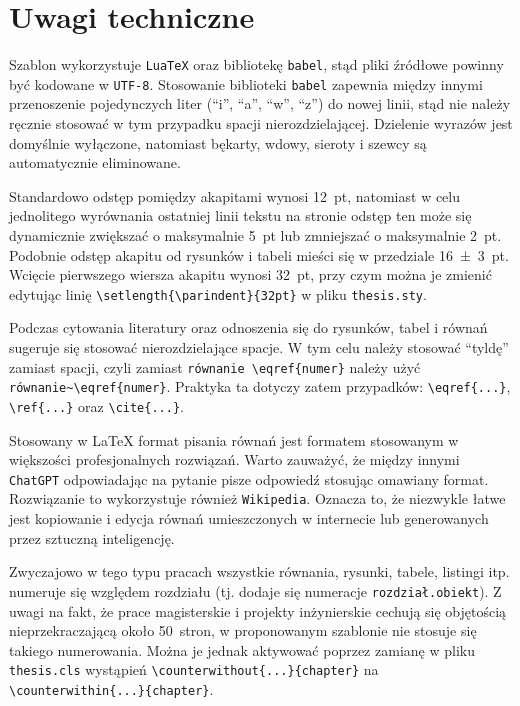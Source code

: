 \begin{listing}[ht!]
\inputminted[linenos, breaklines]{tex}{thesis.tex}
\end{listing}

\section{Uwagi techniczne}

Szablon wykorzystuje \verb|LuaTeX| oraz bibliotekę \verb|babel|, stąd pliki źródłowe powinny być kodowane w \verb|UTF-8|. Stosowanie biblioteki \verb|babel| zapewnia między innymi przenoszenie pojedynczych liter (\enquote{i}, \enquote{a}, \enquote{w}, \enquote{z}) do nowej linii, stąd nie należy ręcznie stosować w tym przypadku spacji nierozdzielającej. Dzielenie wyrazów jest domyślnie wyłączone, natomiast bękarty, wdowy, sieroty i szewcy są automatycznie eliminowane. 

Standardowo odstęp pomiędzy akapitami wynosi \qty{12}{pt}, natomiast w celu jednolitego wyrównania ostatniej linii tekstu na stronie odstęp ten może się dynamicznie zwiększać o maksymalnie \qty{5}{pt} lub zmniejszać o maksymalnie \qty{2}{pt}. Podobnie odstęp akapitu od rysunków i tabeli mieści się w przedziale \qty{16 \pm 3}{pt}. Wcięcie pierwszego wiersza akapitu wynosi \qty{32}{pt}, przy czym można je zmienić edytując linię \verb|\setlength{\parindent}{32pt}| w pliku \verb|thesis.sty|.

Podczas cytowania literatury oraz odnoszenia się do rysunków, tabel i równań sugeruje się stosować nierozdzielające spacje. W tym celu należy stosować \enquote{tyldę} zamiast spacji, czyli zamiast \verb|równanie \eqref{numer}| należy użyć \verb|równanie~\eqref{numer}|. Praktyka ta dotyczy zatem przypadków: \verb|\eqref{...}|, \verb|\ref{...}| oraz \verb|\cite{...}|.

Stosowany w \LaTeX{} format pisania równań jest formatem stosowanym w większości profesjonalnych rozwiązań. Warto zauważyć, że między innymi \verb|ChatGPT| odpowiadając na pytanie pisze odpowiedź stosując omawiany format. Rozwiązanie to wykorzystuje również \verb|Wikipedia|. Oznacza to, że niezwykle łatwe jest kopiowanie i edycja równań umieszczonych w internecie lub generowanych przez sztuczną inteligencję.

Zwyczajowo w tego typu pracach wszystkie równania, rysunki, tabele, listingi itp. numeruje się względem rozdziału (tj. dodaje się numeracje \verb|rozdział.obiekt|). Z uwagi na fakt, że prace magisterskie i projekty inżynierskie cechują się objętością nieprzekraczającą około \qty{50}{stron}, w proponowanym szablonie nie stosuje się takiego numerowania. Można je jednak aktywować poprzez zamianę w pliku \verb|thesis.cls| wystąpień \verb|\counterwithout{...}{chapter}| na \verb|\counterwithin{...}{chapter}|.

